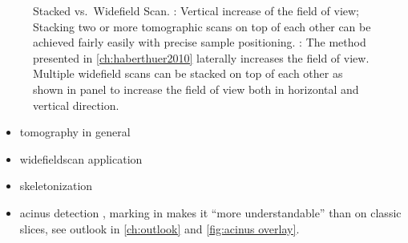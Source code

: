 \def\scale{0.618}
\begin{figure}	[h]
	\noindent{}%
	\caption[Stacked vs.\ Widefield Scan]{Stacked vs.\ Widefield Scan. : Vertical increase of the field of view; Stacking two or more tomographic scans on top of each other can be achieved fairly easily with precise sample positioning. : The method presented in \autoref{ch:haberthuer2010} laterally increases the field of view. Multiple widefield scans can be stacked on top of each other as shown in panel  to increase the field of view both in horizontal and vertical direction.}%
	\label{fig:stack}%
\end{figure}

\begin{itemize}
	\item tomography in general
	\item widefieldscan application
	\item skeletonization
	\item acinus detection \threed, marking in \twod makes it ``more understandable'' than on classic slices, see outlook in \autoref{ch:outlook} and \autoref{fig:acinus overlay}.
\end{itemize}